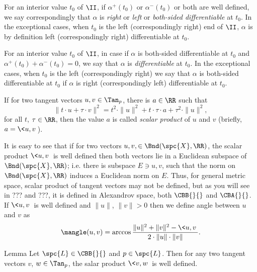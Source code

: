 {For an interior value $t_0$ of $\II$, 
if $\alpha^+(t_0)$ or $\alpha^-(t_0)$ or both are well defined,
we say correspondingly that  $\alpha$ is \emph{right} or \emph{left} or \emph{both-sided differentiable} at $t_0$.
In the exceptional cases, when $t_0$ is the left (correspondingly right) end of $\II$, $\alpha$ is by definition left (correspondingly right) differentiable at $t_0$.

For an interior value $t_0$ of $\II$,
in case if $\alpha$ is both-sided differentiable at $t_0$ and $\alpha^+(t_0)+\alpha^-(t_0)=0$, we say that $\alpha$ is \emph{differentiable} at $t_0$.
In the exceptional cases, when $t_0$ is the left (correspondingly right)
we say that $\alpha$ is both-sided differentiable at $t_0$ if $\alpha$ is right (correspondingly left) differentiable at $t_0$.














If for two tangent vectors $u,v\in\Tan_p$,
there is $a\in\RR$ such that
$$\|t\cdot u+\tau\cdot v\|^2=t^2\cdot\|u\|^2+t\cdot\tau\cdot a+\tau^2\cdot \|u\|^2,$$
for all $t$, $\tau\in\RR$, 
then the value $a$ is called \emph{scalar product} of $u$ and $v$ (briefly, $a=\<u,v\>$).

It is easy to see that if for two vectors $u,v,\in \Bnd(\spc{X},\RR)$, the scalar product $\<u,v\>$ is well defined then both vectors lie in a Euclidean subspace of $\Bnd(\spc{X},\RR)$;
i.e. there is subspace $E\ni u,v$, such that the norm on $\Bnd(\spc{X},\RR)$ induces a Euclidean norm on $E$.
Thus, for general metric space, scalar product of tangent vectors may not be defined, but as you will see in ??? and ???, it is defined in Alexandrov space, both $\CBB{}{}$ and $\CBA{}{}$.
If $\<u,v\>$ is well defined and $\|u\|$, $\|v\|>0$ then we define angle between $u$ and $v$ as 
$$
\mangle(u,v)
=
\arccos\frac{\|u\|^2+\|v\|^2-\<u,v\>}{2\cdot\|u\|\cdot\|v\|}.
$$ 












\begin{thm}{Lemma}
Let $\spc{L}\in\CBB{}{}$ and $p\in\spc{L}$.
Then for any two tangent vectors $v$, $w\in\Tan_p$, the salar product $\<v,w\>$ is well defined.
\end{thm}

}
